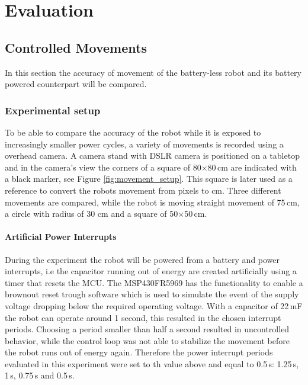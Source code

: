 \chapter{Evaluation} 

\section{Controlled Movements}
\label{sec:controlled_movements}




In this section the accuracy of movement of the battery-less robot and its battery powered counterpart will be compared.

\subsection{Experimental setup}

To be able to compare the accuracy of the robot while it is exposed to increasingly smaller power cycles, a variety of movements is recorded using a overhead camera.
A camera stand with DSLR camera is positioned on a tabletop and in the camera's view the corners of a square of 80$\times$80\,cm are indicated with a black marker, see Figure \ref{fig:movement_setup}.
This square is later used as a reference to convert the robots movement from pixels to cm.
Three different movements are compared, while the robot is moving straight movement of 75\,cm, a circle with radius of 30 cm and a square of 50$\times$50\,cm.

\subsubsection{Artificial Power Interrupts}

During the experiment the robot will be powered from a battery and power interrupts, i.e the capacitor running out of energy are created artificially using a timer that resets the MCU.
The MSP430FR5969 has the functionality to enable a brownout reset trough software which is used to simulate the event of the supply voltage dropping below the required operating voltage.
With a capacitor of 22\,mF the robot can operate around 1 second, this resulted in the chosen interrupt periods.
Choosing a period smaller than half a second resulted in uncontrolled behavior, while the control loop was not able to stabilize the movement before the robot runs out of energy again.
Therefore the power interrupt periods evaluated in this experiment were set to th value above and equal to 0.5\,s: 1.25\,s, 1\,s, 0.75\,s and 0.5\,s.

